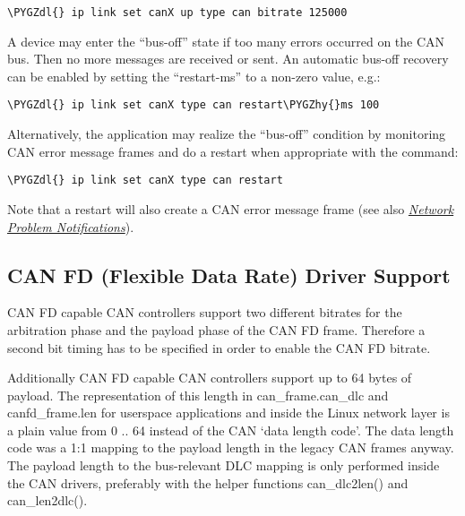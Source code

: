 \documentclass[a4paper,8pt,english]{sphinxmanual}
\def\PYGZdl{\char`\$}
\def\PYGZhy{\char`\-}
\begin{document}
\begin{Verbatim}[commandchars=\\\{\}]
\PYGZdl{} ip link set canX up type can bitrate 125000
\end{Verbatim}

A device may enter the ``bus-off'' state if too many errors occurred on
the CAN bus. Then no more messages are received or sent. An automatic
bus-off recovery can be enabled by setting the ``restart-ms'' to a
non-zero value, e.g.:

\begin{Verbatim}[commandchars=\\\{\}]
\PYGZdl{} ip link set canX type can restart\PYGZhy{}ms 100
\end{Verbatim}

Alternatively, the application may realize the ``bus-off'' condition
by monitoring CAN error message frames and do a restart when
appropriate with the command:

\begin{Verbatim}[commandchars=\\\{\}]
\PYGZdl{} ip link set canX type can restart
\end{Verbatim}

Note that a restart will also create a CAN error message frame (see
also {\hyperref[networking/can:socketcan\string-network\string-problem\string-notifications]{\emph{Network Problem Notifications}}}).


\subsection{CAN FD (Flexible Data Rate) Driver Support}
\label{networking/can:can-fd-flexible-data-rate-driver-support}\label{networking/can:socketcan-can-fd-driver}
CAN FD capable CAN controllers support two different bitrates for the
arbitration phase and the payload phase of the CAN FD frame. Therefore a
second bit timing has to be specified in order to enable the CAN FD bitrate.

Additionally CAN FD capable CAN controllers support up to 64 bytes of
payload. The representation of this length in can\_frame.can\_dlc and
canfd\_frame.len for userspace applications and inside the Linux network
layer is a plain value from 0 .. 64 instead of the CAN `data length code'.
The data length code was a 1:1 mapping to the payload length in the legacy
CAN frames anyway. The payload length to the bus-relevant DLC mapping is
only performed inside the CAN drivers, preferably with the helper
functions can\_dlc2len() and can\_len2dlc().
\end{document}
